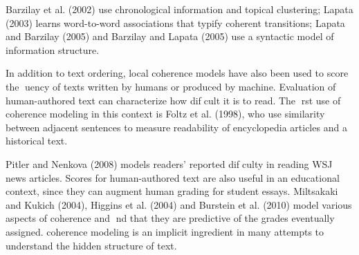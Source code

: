 Barzilay et al. (2002) use chronological information and topical clustering; Lapata (2003) learns word-to-word associations that typify coherent transitions;
Lapata and Barzilay (2005) and Barzilay and Lapata (2005) use a syntactic model of information structure.

In addition to text ordering, local coherence models have also been used to score the uency of texts 
written by humans or produced by machine. Evaluation of human-authored text can characterize how difcult
it is to read. The rst use of coherence modeling in this context is Foltz et al. (1998), who use similarity
between adjacent sentences to measure readability of encyclopedia articles and a historical text. 

Pitler and Nenkova (2008) models readers' reported difculty in reading WSJ news articles. 
Scores for
human-authored text are also useful in an educational context, since they can augment human grading for
student essays. Miltsakaki and Kukich (2004), Higgins et al. (2004) and Burstein et al. (2010) model various
aspects of coherence and nd that they are predictive of the grades eventually assigned.
coherence modeling is an implicit ingredient in many attempts to understand the hidden structure
of text. 



